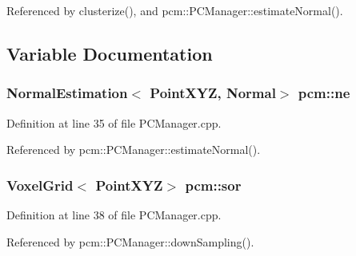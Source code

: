 Referenced by clusterize(), and pcm\-::\-P\-C\-Manager\-::estimate\-Normal().



\subsection{Variable Documentation}
\hypertarget{namespacepcm_acbfa006c5c9699694cdf4f598ff57165}{
\subsubsection[{ne}]{\setlength{\rightskip}{0pt plus 5cm}Normal\-Estimation$<$ Point\-X\-Y\-Z, Normal$>$ pcm\-::ne\hspace{0.3cm}{\ttfamily [static]}}}\label{namespacepcm_acbfa006c5c9699694cdf4f598ff57165}


Definition at line 35 of file P\-C\-Manager.\-cpp.



Referenced by pcm\-::\-P\-C\-Manager\-::estimate\-Normal().

\hypertarget{namespacepcm_a55d9cba2f3ff7122f9162542cde192ac}{
\subsubsection[{sor}]{\setlength{\rightskip}{0pt plus 5cm}Voxel\-Grid$<$ Point\-X\-Y\-Z$>$ pcm\-::sor\hspace{0.3cm}{\ttfamily [static]}}}\label{namespacepcm_a55d9cba2f3ff7122f9162542cde192ac}


Definition at line 38 of file P\-C\-Manager.\-cpp.



Referenced by pcm\-::\-P\-C\-Manager\-::down\-Sampling().

